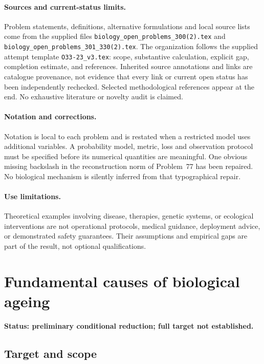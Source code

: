 \documentclass[11pt]{article}
\begin{document}
\paragraph{Sources and current-status limits.}
Problem statements, definitions, alternative formulations and local source lists
come from the supplied files
\texttt{biology\_open\_problems\_300(2).tex} and
\texttt{biology\_open\_problems\_301\_330(2).tex}.
The organization follows the supplied attempt template
\texttt{O33-23\_v3.tex}: scope, substantive calculation, explicit gap,
completion estimate, and references. Inherited source annotations and links are
catalogue provenance, not evidence that every link or current open status has
been independently rechecked. Selected methodological references appear at the
end. No exhaustive literature or novelty audit is claimed.

\paragraph{Notation and corrections.}
Notation is local to each problem and is restated when a restricted model uses
additional variables. A probability model, metric, loss and observation protocol
must be specified before its numerical quantities are meaningful. One obvious
missing backslash in the reconstruction norm of Problem~77 has been repaired.
No biological mechanism is silently inferred from that typographical repair.

\paragraph{Use limitations.}
Theoretical examples involving disease, therapies, genetic systems, or ecological
interventions are not operational protocols, medical guidance, deployment advice,
or demonstrated safety guarantees. Their assumptions and empirical gaps are part
of the result, not optional qualifications.


\section*{Fundamental causes of biological ageing}
\label{prob:301}
\noindent\textbf{Status: preliminary conditional reduction; full target not established.}
\subsection{Target and scope}
\end{document}
